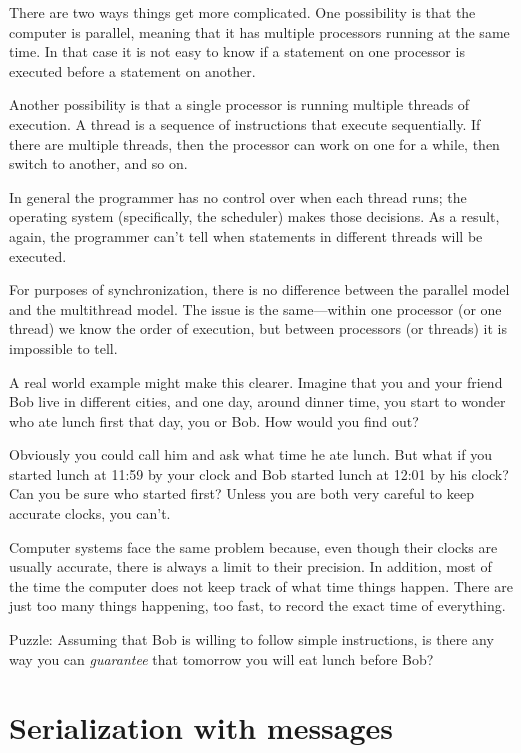 \documentclass{book}
\newcommand{\clearemptydoublepage}{\newpage\cleardoublepage}
\begin{document}
There are two ways things get more complicated.  One possibility
is that the computer is parallel, meaning that it has multiple
processors running at the same time.  In that case it is not easy
to know if a statement on one processor is executed before a
statement on another.

Another possibility is that a single processor is running multiple
threads of execution.  A thread is a sequence of instructions
that execute sequentially.  If there are multiple threads, then
the processor can work on one for a while, then switch to
another, and so on.

In general the programmer has no control over when each thread runs;
the operating system (specifically, the scheduler) makes those
decisions.  As a result, again, the programmer can't tell when
statements in different threads will be executed.

For purposes of synchronization, there is no difference between the
parallel model and the multithread model.  The issue is the
same---within one processor (or one thread) we know the order of
execution, but between processors (or threads) it is impossible to
tell.

A real world example might make this clearer.  Imagine that you and
your friend Bob live in different cities, and one day, around dinner
time, you start to wonder who ate lunch first that day, you or Bob.
How would you find out?

Obviously you could call him and ask what time he ate lunch.  But what
if you started lunch at 11:59 by your clock and Bob started lunch at
12:01 by his clock?  Can you be sure who started first?  Unless you
are both very careful to keep accurate clocks, you can't.

Computer systems face the same problem because, even though their
clocks are usually accurate, there is always a limit to their
precision.  In addition, most of the time the computer does not keep
track of what time things happen.  There are just too many things
happening, too fast, to record the exact time of everything.

Puzzle: Assuming that Bob is willing to follow simple instructions, is
there any way you can {\em guarantee} that tomorrow you will eat lunch
before Bob?

\clearemptydoublepage
\section {Serialization with messages}
\label{serialization}
\end{document}
